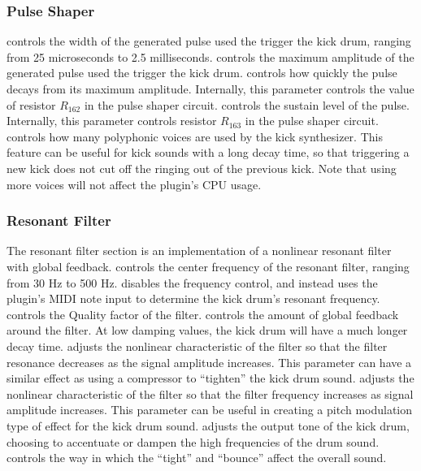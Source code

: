 \documentclass[landscape,twocolumn,a5paper]{manual}
\begin{document}
\subsubsection{Pulse Shaper}
 controls the width of the generated pulse
used the trigger the kick drum, ranging from 25 microseconds
to 2.5 milliseconds.
\newpar
{} controls the maximum amplitude of the
generated pulse used the trigger the kick drum.
\newpar
{} controls how quickly the pulse decays from
its maximum amplitude. Internally, this parameter controls
the value of resistor $R_{162}$ in the pulse shaper circuit.
\newpar
{} controls the sustain level of the pulse.
Internally, this parameter controls resistor $R_{163}$ in
the pulse shaper circuit.
\newpar
{} controls how many polyphonic voices are
used by the kick synthesizer. This feature can be useful for
kick sounds with a long decay time, so that triggering a new
kick does not cut off the ringing out of the previous kick.
Note that using more voices will not affect the plugin's
CPU usage.

\subsubsection{Resonant Filter}
The resonant filter section is an implementation of a nonlinear
resonant filter with global feedback.
\newpar
{} controls the center frequency of the
resonant filter, ranging from 30 Hz to 500 Hz.
\newpar
{} disables the frequency control, and instead
uses the plugin's MIDI note input to determine the kick drum's
resonant frequency.
\newpar
{} controls the Quality factor of the filter.
\newpar
{} controls the amount of global feedback
around the filter. At low damping values, the kick drum
will have a much longer decay time.
\newpar
{} adjusts the nonlinear characteristic
of the filter so that the filter resonance decreases as
the signal amplitude increases. This parameter can have
a similar effect as using a compressor to ``tighten''
the kick drum sound.
\newpar
{} adjusts the nonlinear characteristic
of the filter so that the filter frequency increases as
signal amplitude increases. This parameter can be useful
in creating a pitch modulation type of effect for the kick
drum sound.
\newpar
{} adjusts the output tone of the kick drum,
choosing to accentuate or dampen the high frequencies of
the drum sound.
\newpar
{} controls the way in which the
``tight'' and ``bounce'' affect the overall sound.
\end{document}
